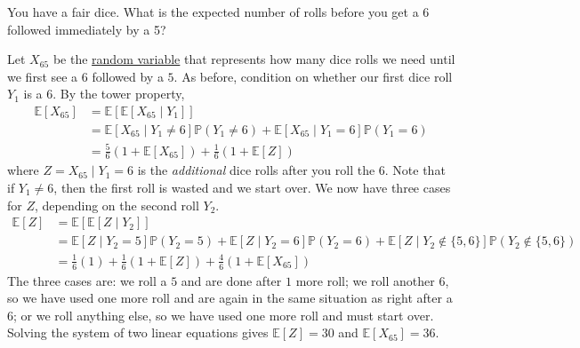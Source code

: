 	\begin{exercise}
	  \label{ex:expected-number-of-rolls-before-getting-6}
		You have a fair dice. What is the expected number of rolls before you get a 6 followed immediately by a 5?
	\end{exercise}
	\begin{solution}
		Let $X_{65}$ be the \hyperref[def:random-variable]{random variable} that represents how many dice rolls we need until we first see a $6$ followed by a $5$. As before, condition on whether our first dice roll $Y_1$ is a 6. By the tower property,
		\begin{align}
			\mathbb{E}[X_{65}] & = \mathbb{E}[ \mathbb{E}[X_{65} \mid Y_1]] \\
												 & = \mathbb{E}[X_{65} \mid Y_1 \neq 6] \mathbb{P}(Y_1 \neq 6) + \mathbb{E}[X_{65} \mid Y_1 = 6] \mathbb{P}(Y_1 = 6) \\
												 & = \frac{5}{6} (1 + \mathbb{E}[X_{65}]) + \frac{1}{6} (1 + \mathbb{E}[Z])
		\end{align}
		where $Z = X_{65} \mid Y_1 = 6$ is the \textit{additional} dice rolls after you roll the $6$. Note that if $Y_1 \neq 6$, then the first roll is wasted and we start over. We now have three cases for $Z$, depending on the second roll $Y_2$.
		\begin{align}
			\mathbb{E}[Z] & = \mathbb{E}[\mathbb{E}[Z \mid Y_2]] \\
										& = \mathbb{E}[Z \mid Y_2 = 5] \mathbb{P}(Y_2 = 5) + \mathbb{E}[Z \mid Y_2 = 6] \mathbb{P}(Y_2 = 6) + \mathbb{E}[Z \mid Y_2 \notin \{5, 6\}] \mathbb{P}(Y_2 \notin \{5, 6\}) \\
										& = \frac{1}{6} (1) + \frac{1}{6} (1 + \mathbb{E}[Z]) + \frac{4}{6} (1 + \mathbb{E}[X_{65}])
		\end{align}
		The three cases are: we roll a $5$ and are done after $1$ more roll; we roll another $6$, so we have used one more roll and are again in the same situation as right after a $6$; or we roll anything else, so we have used one more roll and must start over. Solving the system of two linear equations gives $\mathbb{E}[Z] = 30$ and $\mathbb{E}[X_{65}] = 36$.
	\end{solution}

